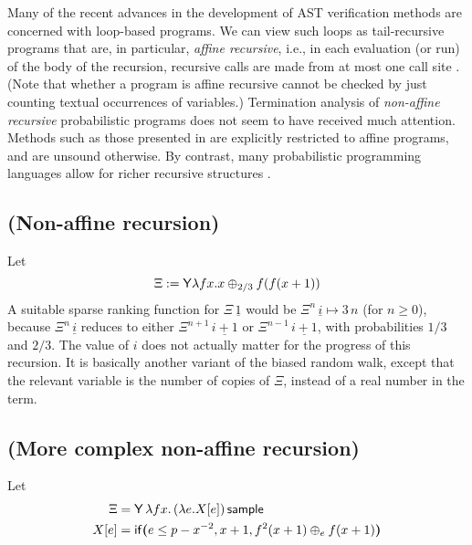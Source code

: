 Many of the recent advances in the development of AST verification methods \citep{DBLP:conf/pldi/ChenH20,DBLP:conf/cav/ChakarovS13,DBLP:conf/popl/FioritiH15,DBLP:journals/pacmpl/McIverMKK18,DBLP:conf/aplas/HuangFC18,DBLP:conf/popl/ChatterjeeNZ17,DBLP:journals/pacmpl/AgrawalC018,DBLP:conf/cav/ChatterjeeFG16,DBLP:conf/lics/OlmedoKKM16,DBLP:journals/pacmpl/Huang0CG19} are concerned with loop-based programs.
We can view such loops as tail-recursive programs that are, in particular, \emph{affine recursive}, i.e., 
in each evaluation (or run) of the body of the recursion, recursive calls are made from at most one call site \cite[\S 4.1]{DBLP:journals/toplas/LagoG19}.
(Note that whether a program is affine recursive cannot be checked by just counting textual occurrences of variables.)
Termination analysis of \emph{non-affine recursive} probabilistic programs does not seem to have received much attention.
Methods such as those presented in \cite{DBLP:journals/toplas/LagoG19} are explicitly restricted to affine programs, and are unsound otherwise.
By contrast, many probabilistic programming languages allow for richer recursive structures \citep{DBLP:conf/pkdd/TolpinMW15,DBLP:conf/uai/GoodmanMRBT08,DBLP:journals/corr/MansinghkaSP14}.

\subsection*{ (Non-affine recursion)}
Let 
\[
\Xi := \mathsf{Y} \lambda f x. x \oplus_{2/3} f (f (x + 1))
\] 
A suitable sparse ranking function for $\Xi \, \underline 1$ would be $\Xi^n \, \underline i \mapsto 3 \, n$ (for $n \geq 0$), because $\Xi^n \, \underline i$ reduces to either $\Xi^{n+1} \, \underline{i+1}$ or $\Xi^{n-1} \, \underline{i+1}$, with probabilities $1/3$ and $2/3$. The value of $i$ does not actually matter for the progress of this recursion. It is basically another variant of the biased random walk, except that the relevant variable is the number of copies of $\Xi$, instead of a real number in the term.


\subsection*{ (More complex non-affine recursion)}
Let
\begin{align*}
\Xi & = \mathsf{Y}\, \lambda f x.\, (\lambda e. X[e]) \, \mathsf{sample} \\
X[e] & = \mathsf{if}\boldsymbol{(}e \leq p - x^{-2}, x+1, f^2(x+1) \oplus_e f(x+1)\boldsymbol{)}
\end{align*}

